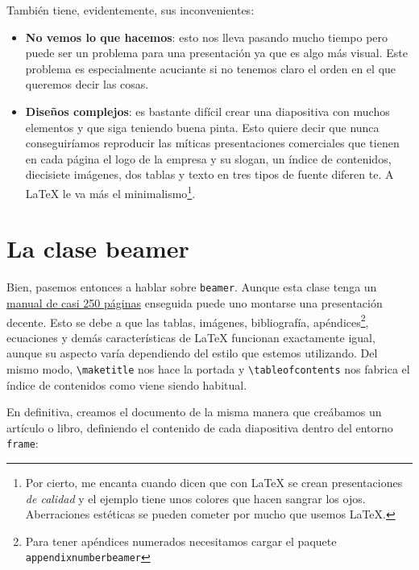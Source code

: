 También tiene, evidentemente, sus inconvenientes:

\begin{itemize}
\item
  \textbf{No vemos lo que hacemos}: esto nos lleva pasando mucho tiempo
  pero puede ser un problema para una presentación ya que es algo más
  visual. Este problema es especialmente acuciante si no tenemos claro
  el orden en el que queremos decir las cosas.
\item
  \textbf{Diseños complejos}: es bastante difícil crear una diapositiva
  con muchos elementos y que siga teniendo buena pinta. Esto quiere
  decir que nunca conseguiríamos reproducir las míticas presentaciones
  comerciales que tienen en cada página el logo de la empresa y su
  slogan, un índice de contenidos, diecisiete imágenes, dos tablas y
  texto en tres tipos de fuente diferen te. A LaTeX le va más el
  minimalismo\footnote{Por cierto, me encanta cuando dicen que con LaTeX
    se crean presentaciones \emph{de calidad} y el ejemplo tiene unos
    colores que hacen sangrar los ojos. Aberraciones estéticas se pueden
    cometer por mucho que usemos LaTeX.}.
\end{itemize}

\section{La clase beamer}

Bien, pasemos entonces a hablar sobre \lstinline!beamer!. Aunque esta
clase tenga un
\href{http://osl.ugr.es/CTAN/macros/latex/contrib/beamer/doc/beameruserguide.pdf}{manual
de casi 250 páginas} enseguida puede uno montarse una presentación
decente. Esto se debe a que las tablas, imágenes,
bibliografía, apéndices\footnote{Para tener apéndices numerados
  necesitamos cargar el paquete \lstinline!appendixnumberbeamer!},
ecuaciones y demás características de LaTeX funcionan exactamente igual,
aunque su aspecto varía dependiendo del estilo que estemos utilizando.
Del mismo modo, \lstinline!\maketitle! nos hace la portada y
\lstinline!\tableofcontents! nos fabrica el índice de contenidos como
viene siendo habitual.

En definitiva, creamos el documento de la misma manera que creábamos un
artículo o libro, definiendo el contenido de cada diapositiva dentro del
entorno \lstinline!frame!:

